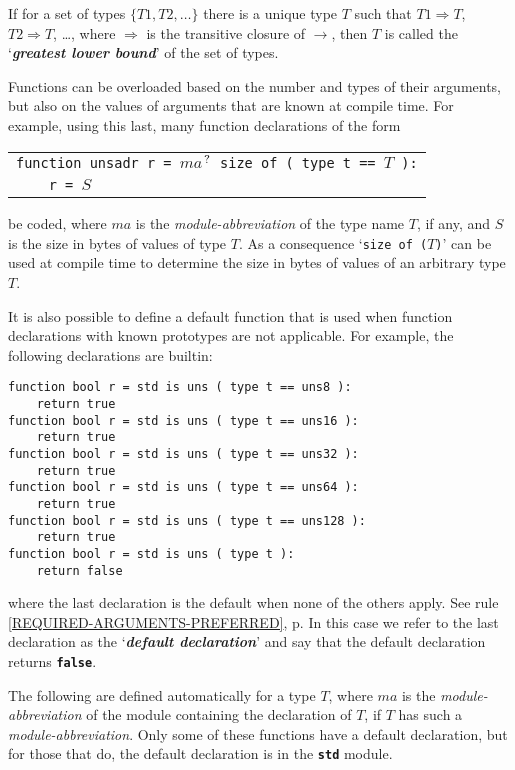 \documentclass[12pt]{article}
\newcommand{\TT}[1]{{\tt \bfseries #1}}
\newcommand{\key}[1]{{\bf \em #1}\index{#1}}
\newcommand{\pagref}[1]{p\pageref{#1}}
\newcommand{\QMARK}{{$^{\,\mbox{\footnotesize ?}}$}}
\newcommand{\TS}{\hspace*{0in}\tt}
\newcommand{\CNV}{\longrightarrow}	%
\newcommand{\TCNV}{\Longrightarrow}	%
\newenvironment{indpar}[1][0.3in]%
	{\begin{list}{}%
		     {\setlength{\itemsep}{0in}%
		      \setlength{\topsep}{0in}%
		      \setlength{\parsep}{1ex}%
		      \setlength{\labelwidth}{#1}%
		      \setlength{\leftmargin}{#1}%
		      \addtolength{\leftmargin}{\labelsep}}%
	 \item}%
	{\end{list}}
\begin{document}
If for a set of types $\{T1,T2,\ldots\}$ there is a unique
type $T$ such that $T1\TCNV T$, $T2\TCNV T$, \ldots{}, where
$\TCNV$ is the transitive closure of $\CNV$, then
$T$ is called the `\key{greatest lower bound}'\label{GREATEST-LOWER-BOUND}
of the set of types.

Functions can be overloaded based on the number and types
of their arguments, but also on the values of arguments that
are known at compile time.  For example, using this last,
many function declarations of the form
\begin{center}
\begin{tabular}{l}
{\tt function unsadr r = $ma$\QMARK{} size of ( type t == $T$ ):} \\
{\TS ~~~~r = $S$}
\end{tabular}
\end{center}
be coded, where $ma$ is the {\em module-abbreviation} of the
type name $T$, if any, and $S$ is the size in bytes of values of type $T$.
As a consequence `{\tt size of ($T$)}' can be used at compile
time to determine the size in bytes of values of an arbitrary type
$T$.

It is also possible to define a default function that is used when
function declarations with known prototypes are not applicable.
For example, the following declarations are builtin:
\begin{indpar}\begin{verbatim}
function bool r = std is uns ( type t == uns8 ):
    return true
function bool r = std is uns ( type t == uns16 ):
    return true
function bool r = std is uns ( type t == uns32 ):
    return true
function bool r = std is uns ( type t == uns64 ):
    return true
function bool r = std is uns ( type t == uns128 ):
    return true
function bool r = std is uns ( type t ):
    return false
\end{verbatim}\end{indpar}
where the last declaration is the default when none of the others
apply.  See
rule \ref{REQUIRED-ARGUMENTS-PREFERRED},
\pagref{REQUIRED-ARGUMENTS-PREFERRED}.
In this case we refer to the last declaration as the
`\key{default declaration}' and say that the default declaration
returns \TT{false}.

The following are defined automatically for a type $T$, where
$ma$ is the {\em module-abbreviation} of the module containing
the declaration of $T$, if $T$ has such a {\em module-abbreviation}.
Only some of these functions have a default declaration, but for
those that do, the default declaration is in the \TT{std} module.
\end{document}
